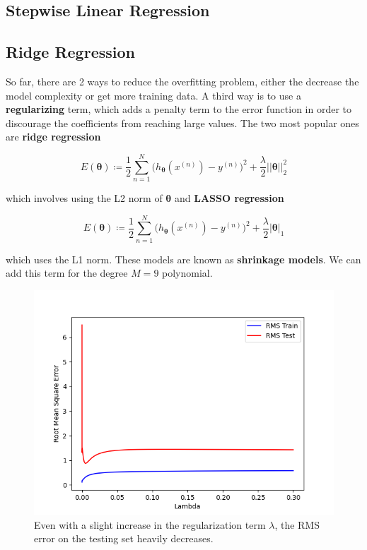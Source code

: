 \documentclass{article}
\begin{document}
  \subsection{Stepwise Linear Regression} 

  \subsection{Ridge Regression} 

    So far, there are 2 ways to reduce the overfitting problem, either the decrease the model complexity or get more training data. A third way is to use a \textbf{regularizing} term, which adds a penalty term to the error function in order to discourage the coefficients from reaching large values. The two most popular ones are \textbf{ridge regression} 

    \[E(\boldsymbol{\theta}) \coloneqq \frac{1}{2} \sum_{n=1}^N \big( h_{\boldsymbol{\theta}} (x^{(n)}) - y^{(n)} \big)^2 + \frac{\lambda}{2} ||\boldsymbol{\theta}||_2^2\]

    which involves using the L2 norm of $\boldsymbol{\theta}$ and \textbf{LASSO regression} 

    \[E(\boldsymbol{\theta}) \coloneqq \frac{1}{2} \sum_{n=1}^N \big( h_{\boldsymbol{\theta}} (x^{(n)}) - y^{(n)} \big)^2 + \frac{\lambda}{2} |\boldsymbol{\theta}|_1\]

    which uses the L1 norm. These models are known as \textbf{shrinkage models}. We can add this term for the degree $M=9$ polynomial. 

    \begin{figure}[H]
      \centering
      \includegraphics[scale=0.5]{img/Lambda_vs_RMS.png}
      \caption{Even with a slight increase in the regularization term $\lambda$, the RMS error on the testing set heavily decreases. }
      \label{fig:enter-label}
    \end{figure}
\end{document}
